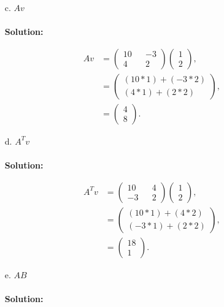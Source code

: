 \documentclass[12pt]{article}
\makeatletter
\theoremstyle{homework}
\newenvironment{exercise}[1]
{\def\@currentlabel{#1}\exercisecore}
{\endexercisecore}
\makeatother
\begin{document}
\begin{exercise}{2}
\begin{enumerate}
  \item[c.] $Av$\\\\
  \textbf{Solution:}

  \begin{align*}
    Av &=
    \begin{pmatrix}
      10 && -3 \\
      4 && 2 
    \end{pmatrix}
    \begin{pmatrix}
      1 \\
      2
    \end{pmatrix},\\
    &=
    \begin{pmatrix}
      (10*1) + (-3*2) \\
      (4*1) + (2*2)
    \end{pmatrix},
    \\
    &= \begin{pmatrix}
      4 \\
      8
    \end{pmatrix}.
  \end{align*}






  \item[d.] $A^{T}v$\\\\
  \textbf{Solution:}

  \begin{align*}
    A^{T}v &=
    \begin{pmatrix}
      10 && 4 \\
      -3 && 2 
    \end{pmatrix}
    \begin{pmatrix}
      1 \\
      2
    \end{pmatrix},\\
    &=
    \begin{pmatrix}
      (10*1) + (4*2) \\
      (-3*1) + (2*2)
    \end{pmatrix},
    \\
    &= \begin{pmatrix}
      18 \\
      1
    \end{pmatrix}.
  \end{align*}




  \item[e.] $AB$\\\\
  \textbf{Solution:}


\end{enumerate}
\end{exercise}
\end{document}
